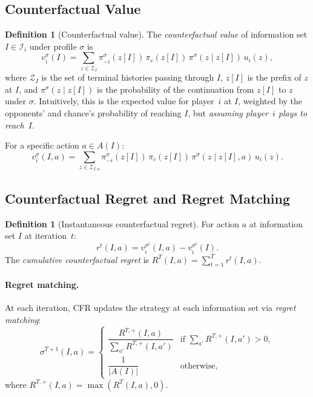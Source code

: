 \documentclass[11pt,a4paper]{article}
\theoremstyle{plain}
\theoremstyle{definition}
\newtheorem{definition}[theorem]{Definition}
\newcommand{\cI}{\mathcal{I}}
\newcommand{\cZ}{\mathcal{Z}}
\begin{document}
\subsection{Counterfactual Value}

\begin{definition}[Counterfactual value]
The \emph{counterfactual value} of information set $I \in \cI_i$ under
profile $\sigma$ is
\[
  v_i^\sigma(I)
  = \sum_{z \in \cZ_I} \pi_{-i}^\sigma(z[I])\, \pi_c(z[I])\,
    \pi^\sigma(z \mid z[I])\, u_i(z),
\]
where $\cZ_I$ is the set of terminal histories passing through $I$,
$z[I]$ is the prefix of $z$ at $I$, and $\pi^\sigma(z \mid z[I])$ is the
probability of the continuation from $z[I]$ to $z$ under $\sigma$.
Intuitively, this is the expected value for player~$i$ at $I$, weighted
by the opponents' and chance's probability of reaching $I$, but
\emph{assuming player~$i$ plays to reach~$I$}.
\end{definition}

For a specific action $a \in A(I)$:
\[
  v_i^\sigma(I, a)
  = \sum_{z \in \cZ_{I,a}} \pi_{-i}^\sigma(z[I])\, \pi_c(z[I])\,
    \pi^\sigma(z \mid z[I], a)\, u_i(z).
\]

\subsection{Counterfactual Regret and Regret Matching}

\begin{definition}[Instantaneous counterfactual regret]
For action $a$ at information set $I$ at iteration~$t$:
\[
  r^t(I, a) = v_i^{\sigma^t}(I, a) - v_i^{\sigma^t}(I).
\]
The \emph{cumulative counterfactual regret} is
$R^T(I, a) = \sum_{t=1}^T r^t(I, a)$.
\end{definition}

\paragraph{Regret matching.}  At each iteration, CFR updates the strategy
at each information set via \emph{regret matching}:
\[
  \sigma^{T+1}(I, a) =
  \begin{cases}
    \dfrac{R^{T,+}(I, a)}{\displaystyle\sum_{a'} R^{T,+}(I, a')}
    & \text{if } \sum_{a'} R^{T,+}(I, a') > 0, \\[8pt]
    \dfrac{1}{|A(I)|} & \text{otherwise},
  \end{cases}
\]
where $R^{T,+}(I,a) = \max(R^T(I,a), 0)$.
\end{document}
